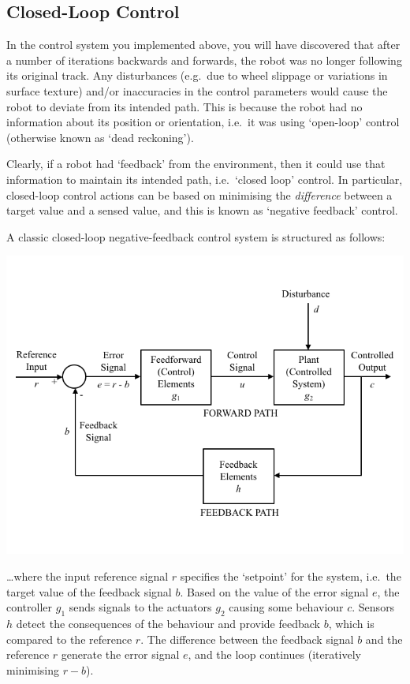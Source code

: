 \documentclass[hidelinks,a4paper,11pt]{article}
\begin{document}
\subsection{Closed-Loop Control}

In the control system you implemented above, you will have discovered that after a number of iterations backwards and forwards, the robot was no longer following its original track.  Any disturbances (e.g.\ due to wheel slippage or variations in surface texture) and/or inaccuracies in the control parameters would cause the robot to deviate from its intended path.  This is because the robot had no information about its position or orientation, i.e.\ it was using `open-loop' control (otherwise known as `dead reckoning').

Clearly, if a robot had `feedback' from the environment, then it could use that information to maintain its intended path, i.e.\ `closed loop' control.  In particular, closed-loop control actions can be based on minimising the \emph{difference} between a target value and a sensed value, and this is known as `negative feedback' control.

A classic closed-loop negative-feedback control system is structured as follows:
\begin{center}
	\includegraphics[width=\textwidth]{ClassicControlSystem.png}
\end{center}

\ldots where the input reference signal $r$ specifies the `setpoint' for the system, i.e.\ the target value of the feedback signal $b$.  Based on the value of the error signal $e$, the controller $g_1$ sends signals to the actuators $g_2$ causing some behaviour $c$.  Sensors $h$ detect the consequences of the behaviour and provide feedback $b$, which is compared to the reference $r$.  The difference between the feedback signal $b$ and the reference $r$ generate the error signal $e$, and the loop continues (iteratively minimising $r-b$).
\end{document}
